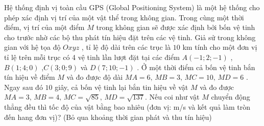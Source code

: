 \begin{ex}%
	Hệ thống định vị toàn cầu GPS (Global Positioning System) là một hệ thống cho phép xác định vị trí của một vật thể trong không gian. Trong cùng một thời điểm, vị trí của một điểm $M$ trong không gian sẽ được xác định bởi bốn vệ tinh cho trước nhờ các bộ thu phát tín hiệu đặt trên các vệ tinh. Giả sử trong không gian với hệ tọa độ $Oxyz$ , tỉ lệ độ dài trên các trục là $10$ km tính cho một đơn vị tỉ lệ trên mỗi trục có 4 vệ tinh lần lượt đặt tại các điểm $A(-1;2;-1)$ ,$B(1;4;0)$ ,$C(3;0;9)$ và $D(7;10;-1)$ . Ở một thời điểm cả bốn vệ tinh bắn tín hiệu về điểm $M$ và đo được độ dài $MA=6,\,MB=3,\,MC=10,\,MD=6$ . Ngay sau đó $10$ giây, cả bốn vệ tinh lại bắn tin hiệu về vật $M$ và đo được $MA=3,\,MB=4,\,MC=\sqrt{85},\,MD=\sqrt{137}$. Nếu coi như vật $M$ chuyển động thẳng đều thì tốc độ của vật bằng bao nhiêu (đơn vị: m/s và kết quả làm tròn đến hang đơn vị)? (Bỏ qua khoảng thời gian phát và thu tín hiệu)
\end{ex}
